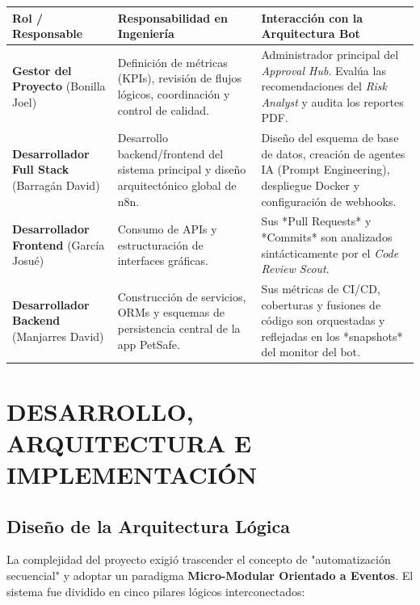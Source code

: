 \documentclass{encabezado}
\begin{document}
\begin{center}
\footnotesize
\renewcommand{\arraystretch}{1.5}
\begin{tabularx}{\textwidth}{P{3.5cm} Y Y}
\toprule
\textbf{Rol / Responsable} & \textbf{Responsabilidad en Ingeniería} & \textbf{Interacción con la Arquitectura Bot} \\
\midrule
\textbf{Gestor del Proyecto} \newline (Bonilla Joel) &
Definición de métricas (KPIs), revisión de flujos lógicos, coordinación y control de calidad. &
Administrador principal del \textit{Approval Hub}. Evalúa las recomendaciones del \textit{Risk Analyst} y audita los reportes PDF. \\
\hline
\textbf{Desarrollador Full Stack} \newline (Barragán David) &
Desarrollo backend/frontend del sistema principal y diseño arquitectónico global de n8n. &
Diseño del esquema de base de datos, creación de agentes IA (Prompt Engineering), despliegue Docker y configuración de webhooks. \\
\hline
\textbf{Desarrollador Frontend} \newline (García Josué) &
Consumo de APIs y estructuración de interfaces gráficas. &
Sus *Pull Requests* y *Commits* son analizados sintácticamente por el \textit{Code Review Scout}. \\
\hline
\textbf{Desarrollador Backend} \newline (Manjarres David) &
Construcción de servicios, ORMs y esquemas de persistencia central de la app PetSafe. &
Sus métricas de CI/CD, coberturas y fusiones de código son orquestadas y reflejadas en los *snapshots* del monitor del bot. \\
\bottomrule
\end{tabularx}
\end{center}

\section{DESARROLLO, ARQUITECTURA E IMPLEMENTACIÓN}

\subsection{Diseño de la Arquitectura Lógica}

La complejidad del proyecto exigió trascender el concepto de "automatización secuencial" y adoptar un paradigma \textbf{Micro-Modular Orientado a Eventos}. El sistema fue dividido en cinco pilares lógicos interconectados:
\end{document}
